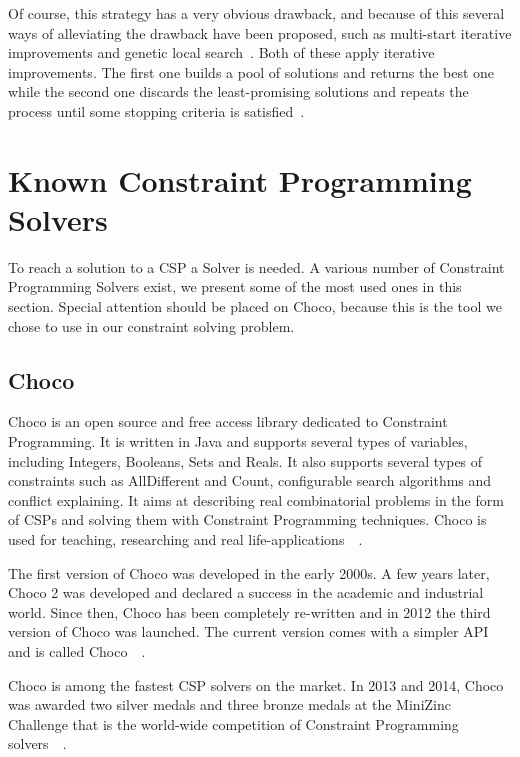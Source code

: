 Of course, this strategy has a very obvious drawback, and because of this several ways of alleviating the drawback have been proposed, such as multi-start iterative improvements and genetic local search~\cite{holland1992adaptation}. Both of these apply iterative improvements. The first one builds a pool of solutions and returns the best one while the second one discards the least-promising solutions and repeats the process until some stopping criteria is satisfied~\cite{jussien2002local}.

\section{Known Constraint Programming Solvers}

To reach a solution to a \ac{CSP} a Solver is needed. A various number of Constraint Programming Solvers exist, we present some of the most used ones in this section. Special attention should be placed on Choco, because this is the tool we chose to use in our constraint solving problem.

\subsection{Choco}

Choco is an open source and free access library dedicated to Constraint Programming. It is written in Java and supports several types of variables, including Integers, Booleans, Sets and Reals. It also supports several types of constraints such as AllDifferent and Count, configurable search algorithms and conflict explaining. It aims at describing real combinatorial problems in the form of \acp{CSP} and solving them with Constraint Programming techniques. Choco is used for teaching, researching and real life-applications~\cite{aboutChoco}~\cite{chocoSolver}.

The first version of Choco was developed in the early 2000s. A few years later, Choco 2 was developed and declared a success in the academic and industrial world. Since then, Choco has been completely re-written and in 2012 the third version of Choco was launched. The current version comes with a simpler API and is called Choco~\cite{historyChoco}~\cite{chocoSolver}.

Choco is among the fastest \ac{CSP} solvers on the market. In 2013 and 2014, Choco was awarded two silver medals and three bronze medals at the MiniZinc Challenge that is the world-wide competition of Constraint Programming solvers~\cite{aboutChoco}~\cite{chocoSolver}.


